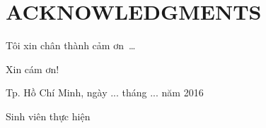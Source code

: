 \chapter*{ACKNOWLEDGMENTS}
\label{thanks}

Tôi xin chân thành cảm ơn~\ldots

Xin cám ơn!

\vspace{3cm}
\hspace{7cm}
\begin{minipage}[ht]{0.48\textwidth}
\begin{center}
Tp. Hồ Chí Minh, ngày ... tháng ... năm 2016

Sinh viên thực hiện

\tenSV
\end{center}
\end{minipage}